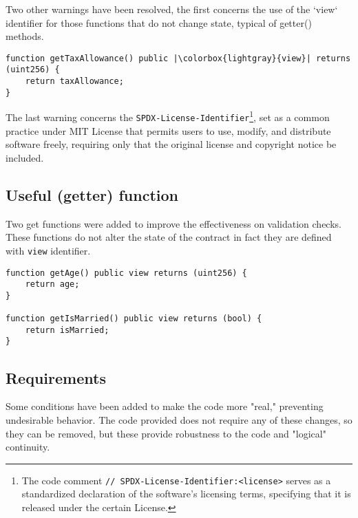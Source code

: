 \documentclass{article}
\begin{document}
Two other warnings have been resolved, the first concerns the use of the `view` identifier for those functions that do not change state, typical of getter() methods.
\begin{verbatim}
function getTaxAllowance() public |\colorbox{lightgray}{view}| returns (uint256) {
    return taxAllowance;
}
\end{verbatim}
The last warning concerns the \texttt{SPDX-License-Identifier}\footnote{The code comment \texttt{// SPDX-License-Identifier:<license>} serves as a standardized declaration of the software's licensing terms, specifying that it is released under the certain License.}, set as a common practice under MIT License that permits users to use, modify, and distribute software freely, requiring only that the original license and copyright notice be included.

\subsection{Useful (getter) function}
Two get functions were added to improve the effectiveness on validation checks. These functions do not alter the state of the contract in fact they are defined with \texttt{view} identifier.
\begin{verbatim}
function getAge() public view returns (uint256) {
    return age;
}

function getIsMarried() public view returns (bool) {
    return isMarried;
}
\end{verbatim}
\subsection{Requirements}
Some conditions have been added to make the code more "real," preventing undesirable behavior. The code provided does not require any of these changes, so they can be removed, but these provide robustness to the code and "logical" continuity.
\end{document}
